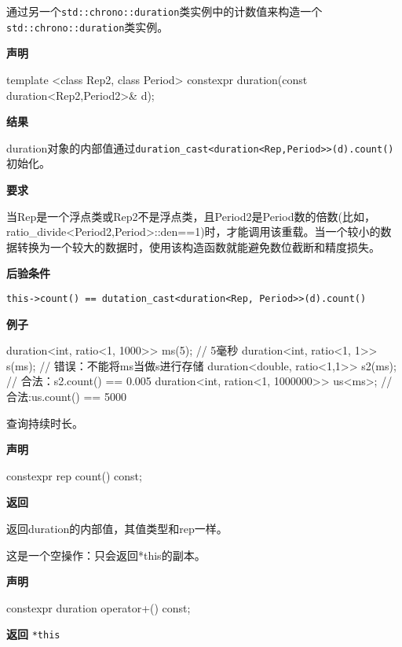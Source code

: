 
通过另一个\texttt{std::chrono::duration}类实例中的计数值来构造一个\texttt{std::chrono::duration}类实例。

\textbf{声明}

\begin{cpp}
template <class Rep2, class Period>
constexpr duration(const duration<Rep2,Period2>& d);
\end{cpp}

\textbf{结果}

duration对象的内部值通过\texttt{duration\_cast<duration<Rep,Period>>(d).count()}初始化。

\textbf{要求}

当Rep是一个浮点类或Rep2不是浮点类，且Period2是Period数的倍数(比如，ratio\_divide<Period2,Period>::den==1)时，才能调用该重载。当一个较小的数据转换为一个较大的数据时，使用该构造函数就能避免数位截断和精度损失。

\textbf{后验条件}

\texttt{this->count() == dutation\_cast<duration<Rep, Period>>(d).count()}

\textbf{例子}

\begin{cpp}
duration<int, ratio<1, 1000>> ms(5);  // 5毫秒
duration<int, ratio<1, 1>> s(ms);  // 错误：不能将ms当做s进行存储
duration<double, ratio<1,1>> s2(ms);  // 合法：s2.count() == 0.005
duration<int, ration<1, 1000000>> us<ms>;  // 合法:us.count() == 5000
\end{cpp}


查询持续时长。

\textbf{声明}

\begin{cpp}
constexpr rep count() const;
\end{cpp}

\textbf{返回}

返回duration的内部值，其值类型和rep一样。


这是一个空操作：只会返回*this的副本。

\textbf{声明}

\begin{cpp}
constexpr duration operator+() const;
\end{cpp}

\textbf{返回}
\texttt{*this}

